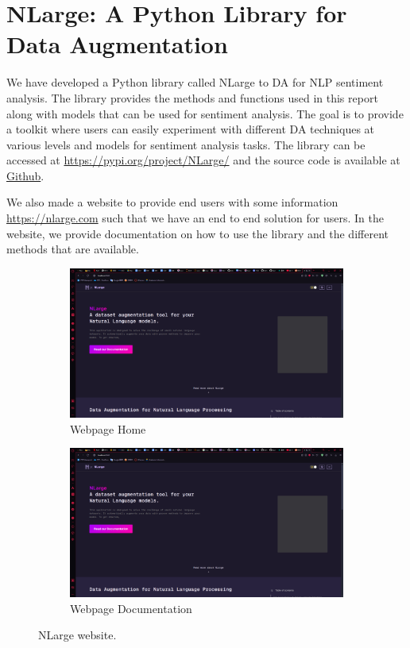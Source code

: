 \documentclass{article}
\begin{document}
\section{NLarge: A Python Library for Data Augmentation}

We have developed a Python library called NLarge to DA for NLP sentiment
analysis. The library provides the methods and functions used in this report
along with models that can be used for sentiment analysis. The goal is to
provide a toolkit where users can easily experiment with different DA
techniques at various levels and models for sentiment analysis tasks. The
library can be accessed at \url{https://pypi.org/project/NLarge/} and the
source code is available at
\href{https://github.com/HiIAmTzeKean/SC4001-NLarge}{Github}.

We also made a website to provide end users with some information
\url{https://nlarge.com} such that we have an end to end solution for users. In
the website, we provide documentation on how to use the library and the
different methods that are available.

\begin{figure}[ht]
  \centering
  \begin{subfigure}[b]{0.45\textwidth}
    \includegraphics[width=\textwidth]{img/nlarge_web_1.png}
    \caption{Webpage Home}
    \label{fig:nlarge_web_1}
  \end{subfigure}
  \hfill
  \begin{subfigure}[b]{0.45\textwidth}
    \includegraphics[width=\textwidth]{img/nlarge_web_1.png}
    \caption{Webpage Documentation}
    \label{fig:nlarge_web_2}
  \end{subfigure}
  \caption{NLarge website.}
  \label{fig:nlarge_web}
\end{figure}
\end{document}
